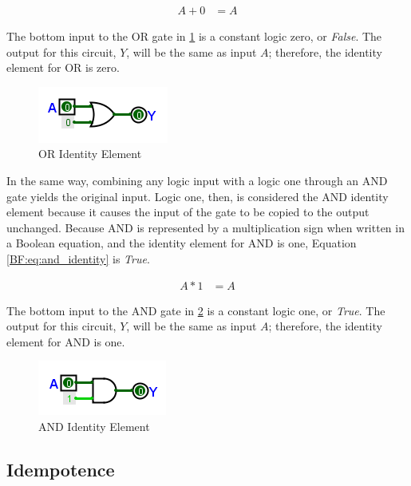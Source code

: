 \begin{align}
  \label{BF:eq:or_identity}
  A + 0 &= A 
\end{align}

The bottom input to the \textsf{OR} gate in \ref{fig:04_10} is a constant logic zero, or \emph{False}. The output for this circuit, $ Y $, will be the same as input $ A $; therefore, the identity element for \textsf{OR}  is zero.  

\begin{figure}[H]
	\centering
	\includegraphics[width=\maxwidth{.95\linewidth}]{gfx/04_10}
	\caption{OR Identity Element}
	\label{fig:04_10}
\end{figure}

In the same way, combining any logic input with a logic one through an \textsf{AND}  gate yields the original input. Logic one, then, is considered the \textsf{AND}  identity element because it causes the input of the gate to be copied to the output unchanged. Because \textsf{AND}  is represented by a multiplication sign when written in a Boolean equation, and the identity element for \textsf{AND} is one, Equation \ref{BF:eq:and_identity} is \emph{True}.

\begin{align}
  \label{BF:eq:and_identity}
  A * 1 &= A 
\end{align}

The bottom input to the \textsf{AND} gate in \ref{fig:04_11} is a constant logic one, or \emph{True}. The output for this circuit, $ Y $, will be the same as input $ A $; therefore, the identity element for \textsf{AND}  is one.  

\begin{figure}[H]
	\centering
	\includegraphics[width=\maxwidth{.95\linewidth}]{gfx/04_11}
	\caption{AND Identity Element}
	\label{fig:04_11}
\end{figure}

\subsection{Idempotence}
\label{BF:subsec:idempotence}

